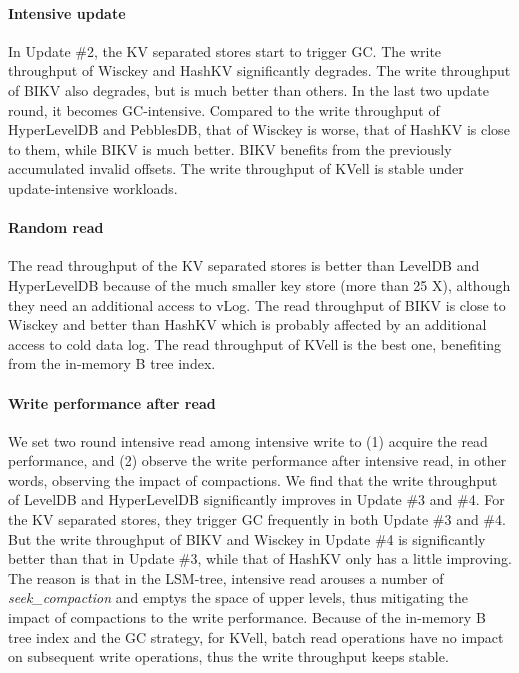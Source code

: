 \documentclass[sigconf]{acmart}
\begin{document}
\paragraph*{Intensive update}
In Update \#2, the KV separated stores start to trigger GC. The write throughput of Wisckey and HashKV significantly degrades. The write throughput of BIKV also degrades, but is much better than others. In the last two update round, it becomes GC-intensive. Compared to the write throughput of HyperLevelDB and PebblesDB, that of Wisckey is worse, that of HashKV is close to them, while BIKV is much better. BIKV benefits from the previously accumulated invalid offsets. The write throughput of KVell is stable under update-intensive workloads. 

\paragraph*{Random read}
The read throughput of the KV separated stores is better than LevelDB and HyperLevelDB because of the much smaller key store (more than 25 X), although they need an additional access to vLog. The read throughput of BIKV is close to Wisckey and better than HashKV which is probably affected by an additional access to cold data log. The read throughput of KVell is the best one, benefiting from the in-memory B tree index.

\paragraph*{Write performance after read}
We set two round intensive read among intensive write to (1) acquire the read performance, and (2) observe the write performance after intensive read, in other words, observing the impact of compactions. We find that the write throughput of LevelDB and HyperLevelDB significantly improves in Update \#3 and \#4. For the KV separated stores, they trigger GC frequently in both Update \#3 and \#4. But the write throughput of BIKV and Wisckey in Update \#4 is significantly better than that in Update \#3, while that of HashKV only has a little improving. The reason is that in the LSM-tree, intensive read arouses a number of \textit{seek\_compaction} and emptys the space of upper levels, thus mitigating the impact of compactions to the write performance. Because of the in-memory B tree index and the GC strategy, for KVell, batch read operations have no impact on subsequent write operations, thus the write throughput keeps stable.
\end{document}
